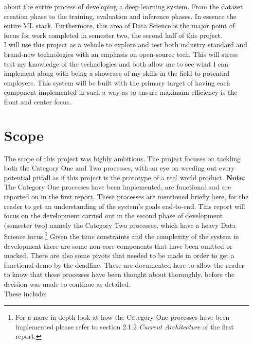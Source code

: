 about the entire process of developing a deep learning system. From the dataset creation phase to the training, evaluation and inference phases. 
In essence the entire ML stack. Furthermore, this area of Data Science is the major point of focus for work completed in semester two, the second half of this project.\\
I will use this project as a vehicle to explore and test both industry standard and brand-new technologies with an emphasis on open-source tech.
This will stress test my knowledge of the
technologies and both allow me to see what I can implement along with being a showcase of my skills in the field to potential employers.
This system will be built with the primary target of having each component implemented in such a way as to ensure maximum efficiency is the 
front and center focus.
\section{Scope}
The scope of this project was highly ambitious. The project focuses on tackling both the Category One and Two processes, with
an eye on weeding out every potential pitfall as if this project is the prototype of a real world product.
\bigbreak
\textbf{Note:} The Category One processes have been implemented, are functional and are reported on in the first report.
These processes are mentioned briefly here, for the reader to get an understanding of the
system's goals end-to-end. This report will focus on the development carried out in the second phase of development (semester two)
namely the Category Two processes, which have a heavy Data Science focus.\footnote{For a more in depth look at how the Category One 
processes have been implemented please refer to section 2.1.2 \emph{Current Architecture} of the first report.}
\bigbreak
Given the time constraints and the complexity of the system in development
there are some non-core components that	have been omitted or mocked. There are also some
pivots that needed to be made in order to get a functional demo by the deadline. These are
documented here to allow the reader to know that these processes have been thought about thoroughly,
before the decision was made to continue as detailed. \\ These include:
